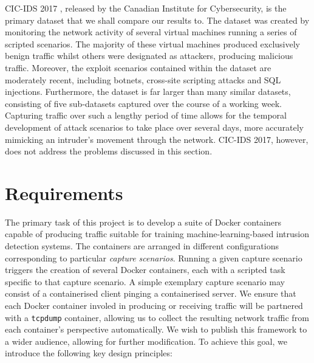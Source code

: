 \documentclass[sigconf,anonymous]{acmart}\usepackage[]{graphicx}\usepackage[]{color}
\begin{document}
CIC-IDS 2017 \cite{sharafaldin2018toward}, released by the Canadian Institute for Cybersecurity, is the primary dataset that we shall compare our results to. The dataset was created by monitoring the network activity of several virtual machines running a series of scripted scenarios. The majority of these virtual machines produced exclusively benign traffic whilst others were designated as attackers, producing malicious traffic. Moreover, the exploit scenarios contained within the dataset are moderately recent, including botnets, cross-site scripting attacks and SQL injections. Furthermore, the dataset is far larger than many similar datasets, consisting of five sub-datasets captured over the course of a working week. Capturing traffic over such a lengthy period of time allows for the temporal development of attack scenarios to take place over several days, more accurately mimicking an intruder's movement through the network. CIC-IDS 2017, however, does not address the problems discussed in this section.



\section{Requirements}
\label{sec:require}

The primary task of this project is to develop a suite of Docker containers capable of producing traffic suitable for training machine-learning-based intrusion detection systems. The containers are arranged in different configurations corresponding to particular \textit{capture scenarios}. Running a given capture scenario triggers the creation of several Docker containers, each with a scripted task specific to that capture scenario. A simple exemplary capture scenario may consist of a containerised client pinging a containerised server. We ensure that each Docker container involed in producing or receiving traffic will be partnered with a \texttt{tcpdump} container, allowing us to collect the resulting network traffic from each container's perspective automatically. We wish to publish this framework to a wider audience, allowing for further modification. To achieve this goal, we introduce the following key design principles:
\end{document}
